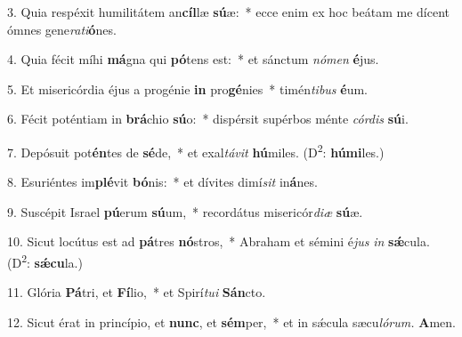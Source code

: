 \item 3. Quia respéxit humilitátem an\textbf{cíl}læ \textbf{sú}æ:~* ecce enim ex hoc beátam me dícent ómnes gene\textit{rati}\textbf{ó}nes.

\item 4. Quia fécit míhi \textbf{má}gna qui \textbf{pó}tens est:~* et sánctum \textit{nómen} \textbf{é}jus.

\item 5. Et misericórdia éjus a progénie \textbf{in} pro\textbf{gé}nies~* timén\textit{tibus} \textbf{é}um.

\item 6. Fécit poténtiam in \textbf{brá}chio \textbf{sú}o:~* dispérsit supérbos ménte \textit{córdis} \textbf{sú}i.

\item 7. Depósuit pot\textbf{én}tes de \textbf{sé}de,~* et exal\textit{távit} \textbf{hú}miles. (D\textsuperscript{2}: \textbf{húmi}les.)

\item 8. Esuriéntes im\textbf{plé}vit \textbf{bó}nis:~* et dívites dimí\textit{sit} in\textbf{á}nes.

\item 9. Suscépit Israel \textbf{pú}erum \textbf{sú}um,~* recordátus misericór\textit{diæ} \textbf{sú}æ.

\item 10. Sicut locútus est ad \textbf{pá}tres \textbf{nó}stros,~* Abraham et sémini é\textit{jus} \textit{in} \textbf{sǽ}cula. (D\textsuperscript{2}: \textbf{sǽcu}la.)

\item 11. Glória \textbf{Pá}tri, et \textbf{Fí}lio,~* et Spirí\textit{tui} \textbf{Sán}cto.

\item 12. Sicut érat in princípio, et \textbf{nunc}, et \textbf{sém}per,~* et in sǽcula sæcu\textit{lórum.} \textbf{A}men.